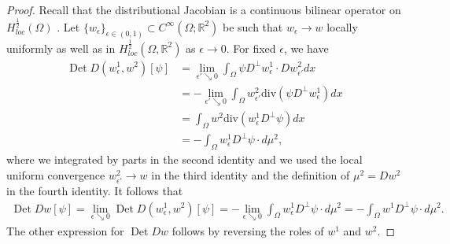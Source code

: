 \documentclass[12pt]{article}
\newcommand{\R}{\mathbb{R}}
\newcommand{\Det}{\operatorname{Det}}
\theoremstyle{plain}
\numberwithin{equation}{section}
\begin{document}
\begin{proof} 
    Recall that the distributional Jacobian is a continuous bilinear operator on $H^\frac12_{loc}(\Omega)$ \cite[Theorem 3]{brezis_nguyen_11}. Let $\{w_\epsilon\}_{\epsilon \in (0,1)} \subset C^\infty(\Omega;\R^2)$ be such that $w_\epsilon \to w$ locally uniformly as well as in $H^\frac12_{loc}(\Omega,\R^2)$ as $\epsilon \rightarrow 0$. For fixed $\epsilon$, we have
    \begin{align*}
        \Det D(w^1_\epsilon, w^2)[\psi] &=  \lim_{\epsilon' \searrow 0} \int_\Omega \psi D^\perp w^1_\epsilon \cdot Dw^2_{\epsilon'} dx\\
        &= -\lim_{\epsilon' \searrow 0} \int_\Omega w^2_{\epsilon'} \mathrm{div}(\psi D^\perp w^1_{\epsilon}) dx\\
        &= \int_\Omega w^2 \mathrm{div}(w^1_\epsilon D^\perp \psi) dx\\
        &= -\int_\Omega w^1_\epsilon D^\perp \psi \cdot d\mu^2,
    \end{align*}
    where we integrated by parts in the second identity and we used the local uniform convergence $w^2_{\epsilon'} \to w$ in the third identity and the definition of $\mu^2 = Dw^2$ in the fourth identity. It follows that
    \begin{align*}
        \Det Dw[\psi] = \lim_{\epsilon \searrow 0} \Det D(w^1_\epsilon, w^2)[\psi] = -\lim_{\epsilon\searrow 0} \int_\Omega w^1_\epsilon D^\perp \psi \cdot d\mu^2 = -\int_\Omega w^1 D^\perp \psi \cdot d\mu^2.
    \end{align*}
    The other expression for $\Det Dw$ follows by reversing the roles of $w^1$ and $w^2$.
\end{proof}
\end{document}
